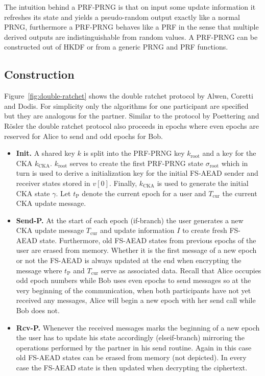 \documentclass[11pt,a4paper,twoside,openright,bibliography=totoc]{scrbook}
\renewcommand{\t}{\text} %
\begin{document}
The intuition behind a PRF-PRNG is that on input some update information
it refreshes its state and yields a pseudo-random output exactly like
a normal PRNG, furthermore a PRF-PRNG behaves like a PRF in the sense
that multiple derived outputs are indistinguishable from random
values. A PRF-PRNG can be constructed out of HKDF or from
a generic PRNG and PRF functions.

\subsection{Construction}
\label{sec:construction-4}

Figure~\ref{fig:double-ratchet} shows the double ratchet protocol by
Alwen, Coretti and Dodis. For simplicity only the algorithms
for one participant are specified but they are analogous for
the partner. Similar to the protocol by Poettering and Rösler
the double ratchet protocol also proceeds in epochs where
even epochs are reserved for Alice to send and odd epochs for Bob.
\begin{itemize}
\item \textbf{Init.} A shared key $k$ is split into the PRF-PRNG key
  $k_\t{root}$ and a key for the CKA $k_\t{CKA}$. $k_\t{root}$ serves
  to create the first PRF-PRNG state $\sigma_\t{root}$ which in
  turn is used to derive a initialization key for the initial
  FS-AEAD sender and receiver states stored in $v[0]$. Finally,
  $k_\t{CKA}$ is used to generate the initial CKA state $\gamma$. Let
  $t_\t{P}$ denote the current epoch for a user and $T_\t{cur}$ the
  current CKA update message.
\item \textbf{Send-P.} At the start of each epoch (if-branch) the user
  generates a new CKA update message $T_\t{cur}$ and update information $I$
  to create fresh FS-AEAD state. Furthermore, old FS-AEAD states from previous
  epochs of the user are erased from memory.
  Whether it is the first message of a new epoch or not the FS-AEAD is
  always updated at the end when encrypting
  the message where $t_\t{P}$ and $T_\t{cur}$ serve as associated data.
  Recall that Alice occupies odd epoch numbers while Bob uses even
  epochs to send messages so at the very beginning of the communication, when both
  participants have not yet received any messages, Alice
  will begin a new epoch with her send call while Bob does not.
\item \textbf{Rcv-P.} Whenever the received messages marks the beginning
  of a new epoch the user has to update his state accordingly (elseif-branch)
  mirroring the operations performed by the partner in his send
  routine. Again in this case old FS-AEAD states can be erased
  from memory (not depicted). In every case the FS-AEAD state
  is then updated when decrypting the ciphertext.
\end{itemize}
\end{document}
